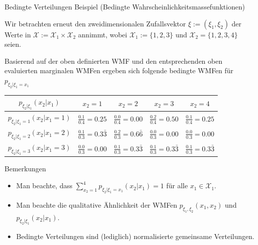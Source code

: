 \documentclass[
  8pt,
  ignorenonframetext,
]{beamer}
\providecommand{\tightlist}{%
  \setlength{\itemsep}{0pt}\setlength{\parskip}{0pt}}
\begin{document}
\begin{frame}{Bedingte Verteilungen}
\protect\hypertarget{bedingte-verteilungen-2}{}
Beispiel (Bedingte Wahrscheinlichkeitsmassefunktionen)

\vspace{2mm}

\small
\justifying

Wir betrachten erneut den zweidimensionalen Zufallsvektor
\(\xi:= (\xi_1,\xi_2)\) der Werte in
\(\mathcal{X} := \mathcal{X}_1 \times \mathcal{X}_2\) annimmt, wobei
\(\mathcal{X}_1 := \{1,2,3\}\) und \(\mathcal{X}_2 = \{1,2,3,4\}\)
seien.

Basierend auf der oben definierten WMF und den entsprechenden oben
evaluierten marginalen WMFen ergeben sich folgende bedingte WMFen für
\(p_{\xi_2|\xi_1 = x_1}\) \vspace{1mm}

\renewcommand{\arraystretch}{1.4}
\begin{center}
\begin{tabular}{|c|cccc|}
\hline
$p_{\xi_2|\xi_1}(x_2|x_1)$
&   $x_2 = 1$
&   $x_2 = 2$
&   $x_2 = 3$
&   $x_2 = 4$
\\\hline
$p_{\xi_2|\xi_1 = 1}(x_2|x_1 = 1)$

&   $\frac{0.1}{0.4} = 0.25$

&   $\frac{0.0}{0.4} = 0.00$

&   $\frac{0.2}{0.4} = 0.50$

&   $\frac{0.1}{0.4} = 0.25$
\\
$p_{\xi_2|\xi_1 = 2}(x_2|x_1 = 2)$

&   $\frac{0.1}{0.3} = 0.3\bar{3}$

&   $\frac{0.2}{0.3} = 0.6\bar{6}$

&   $\frac{0.0}{0.3} = 0.00$

&   $\frac{0.0}{0.3} = 0.00$
\\
$p_{\xi_2|\xi_1 = 3}(x_2|x_1 = 3)$

&   $\frac{0.0}{0.3} = 0.00$

&   $\frac{0.1}{0.3} = 0.3\bar{3}$

&   $\frac{0.1}{0.3} = 0.3\bar{3}$

&   $\frac{0.1}{0.3} = 0.3\bar{3}$
\\\hline
\end{tabular}
\end{center}

\footnotesize

Bemerkungen

\begin{itemize}
\tightlist
\item
  Man beachte, dass
  \(\sum_{x_2 = 1}^4 p_{\xi_2|\xi_1 = x_1}(x_2|x_1) = 1\) für alle
  \(x_1 \in \mathcal{X}_1\).
\item
  Man beachte die qualitative Ähnlichkeit der WMFen
  \(p_{\xi_1,\xi_2}(x_1,x_2)\) und \(p_{\xi_2|\xi_1}(x_2|x_1)\).
\item
  Bedingte Verteilungen sind (lediglich) normalisierte gemeinsame
  Verteilungen.
\end{itemize}
\end{frame}
\end{document}
